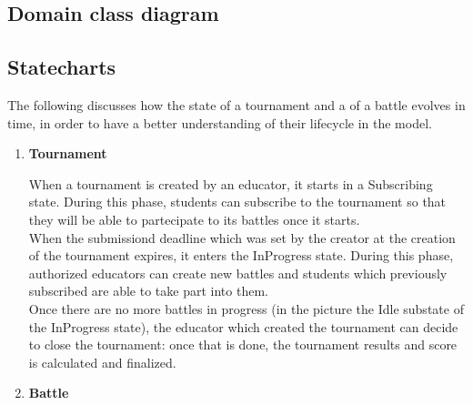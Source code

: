 \subsection{Domain class diagram}
\begin{adjustbox}{
		max size={\textwidth}{},
		caption={Domain class diagram},
		label={fig:Domain class diagram},
		figure=H}
	\centering
\end{adjustbox}
\pagebreak

\subsection{Statecharts}

The following discusses how the state of a tournament and a of a battle
evolves in time, in order to have a better understanding of their lifecycle
in the model.

\begin{enumerate}[label=\textbf{SD\arabic*}:,ref=SD\arabic*,leftmargin=1.3cm]
	\item \textbf{Tournament}
	      \begin{adjustbox}{
			      max size={\textwidth}{},
			      caption={Tournament state diagram},
			      label={fig:Tournament state diagram},
			      figure=H}
		      \centering
	      \end{adjustbox}

	      When a tournament is created by an educator, it starts in a Subscribing state.
	      During this phase, students can subscribe to the tournament so that they will
	      be able to partecipate to its battles once it starts.\\
	      When the submissiond deadline which was set by the creator at the creation of
	      the tournament expires, it enters the InProgress state. During this phase,
	      authorized educators can create new battles and students which previously
	      subscribed are able to take part into them. \\
	      Once there are no more battles in progress (in the picture the Idle substate
	      of the InProgress state), the educator which created the tournament can decide
	      to close the tournament: once that is done, the tournament results and score
	      is calculated and finalized.
	      \pagebreak

	\item \textbf{Battle}
	      \begin{adjustbox}{
			      max size={\textwidth}{\textheightwithcaption{1}},
			      caption={Battle state diagram},
			      label={fig:Battle state diagram},
			      figure=H}
		      \centering
	      \end{adjustbox}

\end{enumerate}

